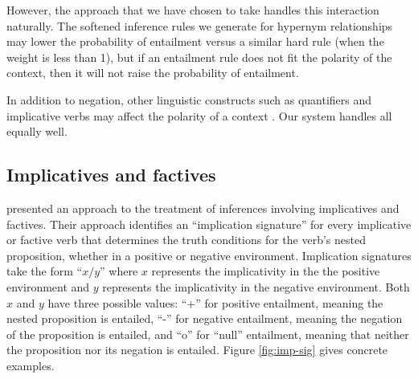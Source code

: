 However, the approach that we have chosen to take handles this interaction
naturally.  The softened inference rules we generate for hypernym relationships
may lower the probability of entailment versus a similar hard rule (when the
weight is less than 1), but if an entailment rule does not fit the polarity of
the context, then it will not raise the probability of entailment.

In addition to negation, other linguistic constructs such as quantifiers and
implicative verbs may affect the polarity of a context
\citep{maccartney:iwcs2009}.  Our system handles all equally well.




\subsection*{Implicatives and factives}

\citet{nairn:icos2006} presented an approach to the treatment of inferences
involving implicatives and factives.  Their approach identifies an ``implication
signature'' for every implicative or factive verb that determines the truth
conditions for the verb's nested proposition, whether in a positive or negative
environment.  Implication signatures take the form ``$x/y$'' where $x$
represents the implicativity in the the positive environment and $y$ represents
the implicativity in the negative environment.  Both $x$ and $y$ have three
possible values: ``+'' for positive entailment, meaning the nested proposition
is entailed, ``-'' for negative entailment, meaning the negation of the proposition
is entailed, and ``o'' for ``null'' entailment, meaning that neither the
proposition nor its negation is entailed. Figure \ref{fig:imp-sig} gives
concrete examples.%


